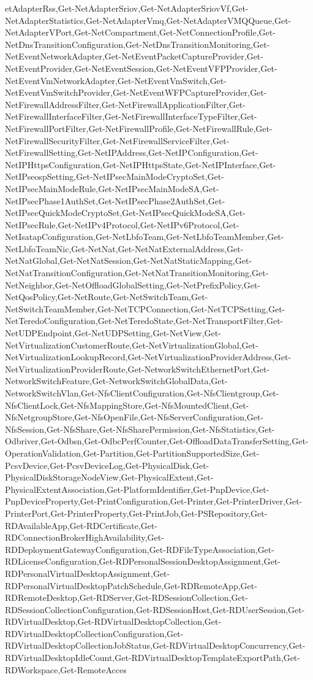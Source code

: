 {{etAdapterRss,Get-NetAdapterSriov,Get-NetAdapterSriovVf,Get-NetAdapterStatistics,Get-NetAdapterVmq,Get-NetAdapterVMQQueue,Get-NetAdapterVPort,Get-NetCompartment,Get-NetConnectionProfile,Get-NetDnsTransitionConfiguration,Get-NetDnsTransitionMonitoring,Get-NetEventNetworkAdapter,Get-NetEventPacketCaptureProvider,Get-NetEventProvider,Get-NetEventSession,Get-NetEventVFPProvider,Get-NetEventVmNetworkAdapter,Get-NetEventVmSwitch,Get-NetEventVmSwitchProvider,Get-NetEventWFPCaptureProvider,Get-NetFirewallAddressFilter,Get-NetFirewallApplicationFilter,Get-NetFirewallInterfaceFilter,Get-NetFirewallInterfaceTypeFilter,Get-NetFirewallPortFilter,Get-NetFirewallProfile,Get-NetFirewallRule,Get-NetFirewallSecurityFilter,Get-NetFirewallServiceFilter,Get-NetFirewallSetting,Get-NetIPAddress,Get-NetIPConfiguration,Get-NetIPHttpsConfiguration,Get-NetIPHttpsState,Get-NetIPInterface,Get-NetIPseospSetting,Get-NetIPsecMainModeCryptoSet,Get-NetIPsecMainModeRule,Get-NetIPsecMainModeSA,Get-NetIPsecPhase1AuthSet,Get-NetIPsecPhase2AuthSet,Get-NetIPsecQuickModeCryptoSet,Get-NetIPsecQuickModeSA,Get-NetIPsecRule,Get-NetIPv4Protocol,Get-NetIPv6Protocol,Get-NetIsatapConfiguration,Get-NetLbfoTeam,Get-NetLbfoTeamMember,Get-NetLbfoTeamNic,Get-NetNat,Get-NetNatExternalAddress,Get-NetNatGlobal,Get-NetNatSession,Get-NetNatStaticMapping,Get-NetNatTransitionConfiguration,Get-NetNatTransitionMonitoring,Get-NetNeighbor,Get-NetOffloadGlobalSetting,Get-NetPrefixPolicy,Get-NetQosPolicy,Get-NetRoute,Get-NetSwitchTeam,Get-NetSwitchTeamMember,Get-NetTCPConnection,Get-NetTCPSetting,Get-NetTeredoConfiguration,Get-NetTeredoState,Get-NetTransportFilter,Get-NetUDPEndpoint,Get-NetUDPSetting,Get-NetView,Get-NetVirtualizationCustomerRoute,Get-NetVirtualizationGlobal,Get-NetVirtualizationLookupRecord,Get-NetVirtualizationProviderAddress,Get-NetVirtualizationProviderRoute,Get-NetworkSwitchEthernetPort,Get-NetworkSwitchFeature,Get-NetworkSwitchGlobalData,Get-NetworkSwitchVlan,Get-NfsClientConfiguration,Get-NfsClientgroup,Get-NfsClientLock,Get-NfsMappingStore,Get-NfsMountedClient,Get-NfsNetgroupStore,Get-NfsOpenFile,Get-NfsServerConfiguration,Get-NfsSession,Get-NfsShare,Get-NfsSharePermission,Get-NfsStatistics,Get-Odbriver,Get-Odbsn,Get-OdbcPerfCounter,Get-OffloadDataTransferSetting,Get-OperationValidation,Get-Partition,Get-PartitionSupportedSize,Get-PcsvDevice,Get-PcsvDeviceLog,Get-PhysicalDisk,Get-PhysicalDiskStorageNodeView,Get-PhysicalExtent,Get-PhysicalExtentAssociation,Get-PlatformIdentifier,Get-PnpDevice,Get-PnpDeviceProperty,Get-PrintConfiguration,Get-Printer,Get-PrinterDriver,Get-PrinterPort,Get-PrinterProperty,Get-PrintJob,Get-PSRepository,Get-RDAvailableApp,Get-RDCertificate,Get-RDConnectionBrokerHighAvailability,Get-RDDeploymentGatewayConfiguration,Get-RDFileTypeAssociation,Get-RDLicenseConfiguration,Get-RDPersonalSessionDesktopAssignment,Get-RDPersonalVirtualDesktopAssignment,Get-RDPersonalVirtualDesktopPatchSchedule,Get-RDRemoteApp,Get-RDRemoteDesktop,Get-RDServer,Get-RDSessionCollection,Get-RDSessionCollectionConfiguration,Get-RDSessionHost,Get-RDUserSession,Get-RDVirtualDesktop,Get-RDVirtualDesktopCollection,Get-RDVirtualDesktopCollectionConfiguration,Get-RDVirtualDesktopCollectionJobStatus,Get-RDVirtualDesktopConcurrency,Get-RDVirtualDesktopIdleCount,Get-RDVirtualDesktopTemplateExportPath,Get-RDWorkspace,Get-RemoteAcces}}
